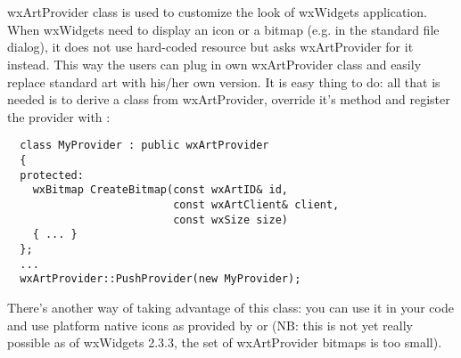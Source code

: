 %
%

\section{}\label{wxartprovider}

wxArtProvider class is used to customize the look of wxWidgets application.
When wxWidgets need to display an icon or a bitmap (e.g. in the standard file
dialog), it does not use hard-coded resource but asks wxArtProvider for it
instead. This way the users can plug in own wxArtProvider class and easily
replace standard art with his/her own version. It is easy thing to do: all
that is needed is to derive a class from wxArtProvider, override it's
 method and register the
provider with
:

\begin{verbatim}
  class MyProvider : public wxArtProvider
  {
  protected:
    wxBitmap CreateBitmap(const wxArtID& id, 
                          const wxArtClient& client,
                          const wxSize size)
    { ... }
  };
  ...
  wxArtProvider::PushProvider(new MyProvider);
\end{verbatim}

There's another way of taking advantage of this class: you can use it in your code and use
platform native icons as provided by
 or 
 (NB: this is not yet really
possible as of wxWidgets 2.3.3, the set of wxArtProvider bitmaps is too
small). 


